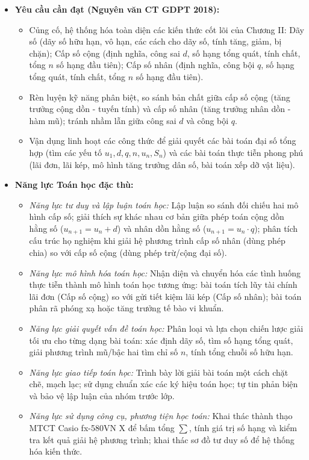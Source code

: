 \documentclass[12pt, a4paper]{article}
\begin{document}
\begin{itemize}[leftmargin=1.2cm]
    \item \textbf{Yêu cầu cần đạt (Nguyên văn CT GDPT 2018):}
    \begin{itemize}[leftmargin=0.6cm]
        \item Củng cố, hệ thống hóa toàn diện các kiến thức cốt lõi của Chương II: Dãy số (dãy số hữu hạn, vô hạn, các cách cho dãy số, tính tăng, giảm, bị chặn); Cấp số cộng (định nghĩa, công sai $d$, số hạng tổng quát, tính chất, tổng $n$ số hạng đầu tiên); Cấp số nhân (định nghĩa, công bội $q$, số hạng tổng quát, tính chất, tổng $n$ số hạng đầu tiên).
        \item Rèn luyện kỹ năng phân biệt, so sánh bản chất giữa cấp số cộng (tăng trưởng cộng dồn - tuyến tính) và cấp số nhân (tăng trưởng nhân dồn - hàm mũ); tránh nhầm lẫn giữa công sai $d$ và công bội $q$.
        \item Vận dụng linh hoạt các công thức để giải quyết các bài toán đại số tổng hợp (tìm các yếu tố $u_1, d, q, n, u_n, S_n$) và các bài toán thực tiễn phong phú (lãi đơn, lãi kép, mô hình tăng trưởng dân số, bài toán xếp dỡ vật liệu).
    \end{itemize}

    \item \textbf{Năng lực Toán học đặc thù:}
    \begin{itemize}[leftmargin=0.6cm]
        \item \textit{Năng lực tư duy và lập luận toán học:} Lập luận so sánh đối chiếu hai mô hình cấp số; giải thích sự khác nhau cơ bản giữa phép toán cộng dồn hằng số ($u_{n+1} = u_n + d$) và nhân dồn hằng số ($u_{n+1} = u_n \cdot q$); phân tích cấu trúc họ nghiệm khi giải hệ phương trình cấp số nhân (dùng phép chia) so với cấp số cộng (dùng phép trừ/cộng đại số).
        \item \textit{Năng lực mô hình hóa toán học:} Nhận diện và chuyển hóa các tình huống thực tiễn thành mô hình toán học tương ứng: bài toán tích lũy tài chính lãi đơn (Cấp số cộng) so với gửi tiết kiệm lãi kép (Cấp số nhân); bài toán phân rã phóng xạ hoặc tăng trưởng tế bào vi khuẩn.
        \item \textit{Năng lực giải quyết vấn đề toán học:} Phân loại và lựa chọn chiến lược giải tối ưu cho từng dạng bài toán: xác định dãy số, tìm số hạng tổng quát, giải phương trình mũ/bậc hai tìm chỉ số $n$, tính tổng chuỗi số hữu hạn.
        \item \textit{Năng lực giao tiếp toán học:} Trình bày lời giải bài toán một cách chặt chẽ, mạch lạc; sử dụng chuẩn xác các ký hiệu toán học; tự tin phản biện và bảo vệ lập luận của nhóm trước lớp.
        \item \textit{Năng lực sử dụng công cụ, phương tiện học toán:} Khai thác thành thạo MTCT Casio fx-580VN X để bấm tổng $\sum$, tính giá trị số hạng và kiểm tra kết quả giải hệ phương trình; khai thác sơ đồ tư duy số để hệ thống hóa kiến thức.
    \end{itemize}


\end{itemize}
\end{document}
